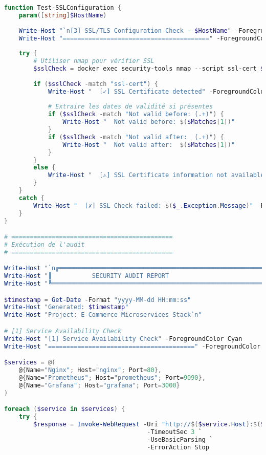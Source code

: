 \documentclass[11pt,a4paper]{report}
\begin{document}
\begin{lstlisting}[language=PowerShell, caption=security-audit.ps1 - Audit de Sécurité Complet, basicstyle=\ttfamily\tiny]
function Test-SSLConfiguration {
    param([string]$HostName)
    
    Write-Host "`n[3] SSL/TLS Configuration Check - $HostName" -ForegroundColor Cyan
    Write-Host "========================================" -ForegroundColor Cyan
    
    try {
        # Utiliser nmap pour vérifier SSL
        $sslCheck = docker exec security-tools nmap --script ssl-cert $HostName -p 443 2>&1
        
        if ($sslCheck -match "ssl-cert") {
            Write-Host "  [✓] SSL Certificate detected" -ForegroundColor Green
            
            # Extraire les dates de validité si présentes
            if ($sslCheck -match "Not valid before: (.+)") {
                Write-Host "  Not valid before: $($Matches[1])"
            }
            if ($sslCheck -match "Not valid after:  (.+)") {
                Write-Host "  Not valid after:  $($Matches[1])"
            }
        }
        else {
            Write-Host "  [⚠] SSL Certificate information not available" -ForegroundColor Yellow
        }
    }
    catch {
        Write-Host "  [✗] SSL Check failed: $($_.Exception.Message)" -ForegroundColor Red
    }
}

# ============================================
# Exécution de l'audit
# ============================================

Write-Host "`n╔═══════════════════════════════════════════════════════════╗" -ForegroundColor Cyan
Write-Host "║           SECURITY AUDIT REPORT                           ║" -ForegroundColor Cyan
Write-Host "╚═══════════════════════════════════════════════════════════╝`n" -ForegroundColor Cyan

$timestamp = Get-Date -Format "yyyy-MM-dd HH:mm:ss"
Write-Host "Generated: $timestamp"
Write-Host "Project: E-Commerce Microservices Stack`n"

# [1] Service Availability Check
Write-Host "[1] Service Availability Check" -ForegroundColor Cyan
Write-Host "========================================" -ForegroundColor Cyan

$services = @(
    @{Name="Nginx"; Host="nginx"; Port=80},
    @{Name="Prometheus"; Host="prometheus"; Port=9090},
    @{Name="Grafana"; Host="grafana"; Port=3000}
)

foreach ($service in $services) {
    try {
        $response = Invoke-WebRequest -Uri "http://$($service.Host):$($service.Port)" `
                                       -TimeoutSec 3 `
                                       -UseBasicParsing `
                                       -ErrorAction Stop
        

\end{lstlisting}
\end{document}
